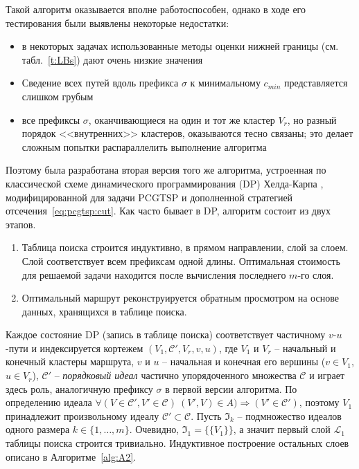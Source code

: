 Такой алгоритм оказывается вполне работоспособен,
однако в ходе его тестирования были выявлены некоторые недостатки:
\begin{itemize}
    \item
    в некоторых задачах использованные методы
    оценки нижней границы
    (см. табл.~\ref{t:LBs})
    дают очень низкие значения
    \item
    Сведение всех путей вдоль префикса $\sigma$
    к минимальному $c_{min}$
    представляется слишком грубым
    \item
    все префиксы $\sigma$,
    оканчивающиеся на один и тот же
    кластер $V_r$,
    но разный порядок <<внутренних>> кластеров,
    оказываются тесно связаны;
    это делает сложным попытки распараллелить
    выполнение алгоритма
\end{itemize}

Поэтому была разработана вторая версия того же алгоритма,
устроенная по классической схеме
динамического программирования (DP)
Хелда-Карпа
\autocite{HeldKarp1962},
модифицированной для задачи PCGTSP
и дополненной стратегией отсечения~\eqref{eq:pcgtsp:cut}.
Как часто бывает в DP,
алгоритм состоит из двух этапов.
\begin{enumerate}
  \item
  Таблица поиска строится индуктивно,
  в прямом направлении,
  слой за слоем.
  Слой соответствует всем префиксам одной длины.
  Оптимальная стоимость для решаемой задачи
  находится после вычисления последнего $m$-го слоя.
  \item
  Оптимальный маршрут реконструируется обратным просмотром
  на основе данных,
  хранящихся в таблице поиска.
\end{enumerate}

Каждое состояние DP
(запись в таблице поиска)
соответствует частичному
$v$-$u$-пути
и индексируется кортежем
$(V_1, \mathcal C',V_r,v, u)$, где
$V_1$ и $V_r$ -- начальный и конечный кластеры маршрута,
$v$ и $u$ -- начальная и конечная его вершины ($v\in V_1$, $u\in V_r$),
$\mathcal C'$ -- {\it порядковый идеал} частично упорядоченного множества $\mathcal C$
и играет здесь роль, аналогичную префиксу $\sigma$
в первой версии алгоритма.
По определению идеала
\(
    \forall (V\in\mathcal C', V'\in\mathcal C)\   (V',V)\in A)
    \Rightarrow (V'\in\mathcal C')
\),
поэтому $V_1$
принадлежит произвольному идеалу
$\mathcal C'\subset\mathcal C$.
Пусть $\mathfrak I_k$
-- подмножество идеалов одного размера
$k\in\{1,\ldots,m\}$.
Очевидно,
$\mathfrak I_1=\{\{V_1\}\}$,
а значит первый слой
$\mathcal L_1$
таблицы поиска строится тривиально.
Индуктивное построение остальных слоев
описано в Алгоритме~\ref{alg:A2}.


